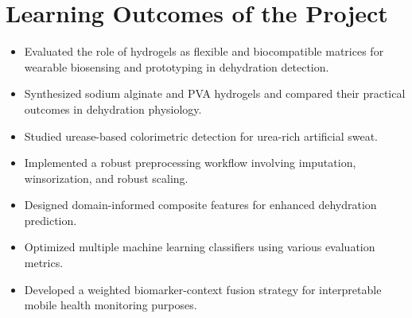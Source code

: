 \section{Learning Outcomes of the Project}

\begin{itemize}
\item Evaluated the role of hydrogels as flexible and biocompatible matrices for wearable biosensing and prototyping in dehydration detection.
\item Synthesized sodium alginate and PVA hydrogels and compared their practical outcomes in dehydration physiology.
\item Studied urease-based colorimetric detection for urea-rich artificial sweat.
\item Implemented a robust preprocessing workflow involving imputation, winsorization, and robust scaling.
\item Designed domain-informed composite features for enhanced dehydration prediction.
\item Optimized multiple machine learning classifiers using various evaluation metrics.
\item Developed a weighted biomarker-context fusion strategy for interpretable mobile health monitoring purposes.
\end{itemize}

